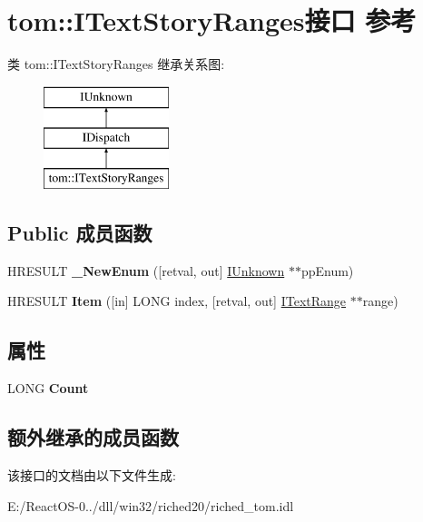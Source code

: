 \hypertarget{interfacetom_1_1_i_text_story_ranges}{}\section{tom\+:\+:I\+Text\+Story\+Ranges接口 参考}
\label{interfacetom_1_1_i_text_story_ranges}
类 tom\+:\+:I\+Text\+Story\+Ranges 继承关系图\+:\begin{figure}[H]
\begin{center}
\leavevmode
\includegraphics[height=3.000000cm]{interfacetom_1_1_i_text_story_ranges}
\end{center}
\end{figure}
\subsection*{Public 成员函数}
\begin{DoxyCompactItemize}
\item 
\mbox{\label{interfacetom_1_1_i_text_story_ranges_a71c1afaaf44059e889277b45707d0f35}} 
H\+R\+E\+S\+U\+LT {\bfseries \+\_\+\+New\+Enum} (\mbox{[}retval, out\mbox{]} \hyperlink{interface_i_unknown}{I\+Unknown} $\ast$$\ast$pp\+Enum)
\item 
\mbox{\label{interfacetom_1_1_i_text_story_ranges_adc166bbbfa23a255bdc5b674b58504e5}} 
H\+R\+E\+S\+U\+LT {\bfseries Item} (\mbox{[}in\mbox{]} L\+O\+NG index, \mbox{[}retval, out\mbox{]} \hyperlink{interfacetom_1_1_i_text_range}{I\+Text\+Range} $\ast$$\ast$range)
\end{DoxyCompactItemize}
\subsection*{属性}
\begin{DoxyCompactItemize}
\item 
\mbox{\label{interfacetom_1_1_i_text_story_ranges_ad5ac49e2e918858895f56ff84e2d2fae}} 
L\+O\+NG {\bfseries Count}
\end{DoxyCompactItemize}
\subsection*{额外继承的成员函数}


该接口的文档由以下文件生成\+:\begin{DoxyCompactItemize}
\item 
E\+:/\+React\+O\+S-\/0../dll/win32/riched20/riched\+\_\+tom.\+idl\end{DoxyCompactItemize}

